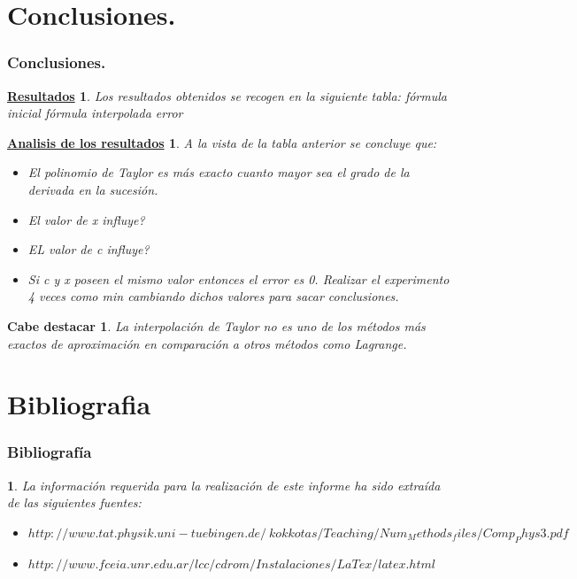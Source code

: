 \documentclass{beamer}
\newtheorem{procedimiento}{Cabe destacar}
\newtheorem{descripcion de los experimentos}{\underline {Descripcion de los experimentos}}
\newtheorem{resultados}{\underline {Resultados}}
\newtheorem{analisis}{\underline {Analisis de los resultados}}
\newtheorem{anotacion}{ }
\begin{document}
\section{Conclusiones.}
\begin{frame}
\frametitle{Conclusiones.}
 \tableofcontents[pausesections]
\begin{resultados}
Los resultados obtenidos se recogen en la siguiente tabla:
fórmula inicial  fórmula interpolada  error
\end{resultados}
\begin{analisis}
A la vista de la tabla anterior se concluye que:
\begin {itemize}
\item El polinomio de Taylor es más exacto cuanto mayor sea el grado de la derivada en la sucesión.
\item El valor de x influye?
\item EL valor de c influye?
\item Si c y x poseen el mismo valor entonces el error es 0.
Realizar el experimento 4 veces como min cambiando dichos valores para sacar conclusiones.
\end {itemize}
\end{analisis}
\end {frame}

\begin {frame}
\begin{procedimiento}
La interpolación de Taylor no es uno de los métodos más exactos de aproximación en comparación  a otros métodos como Lagrange.
\end {procedimiento}
\end{frame}

\section{Bibliografia}
\begin{frame}
 \frametitle{Bibliografía}
\begin {anotacion}  
   La información requerida para la realización de este informe ha sido extraída de las siguientes fuentes:
\end {anotacion}
  \begin{thebibliography}{10}
    \beamertemplatebookbibitems
\begin{itemize}
    \item {\small $http://www.tat.physik.uni-tuebingen.de/~kokkotas/Teaching/Num_Methods_files/Comp_Phys3.pdf$}
    \item {\small $http://www.fceia.unr.edu.ar/lcc/cdrom/Instalaciones/LaTex/latex.html$}
\end {itemize}
  \end{thebibliography}
\end{frame}
\end{document}
